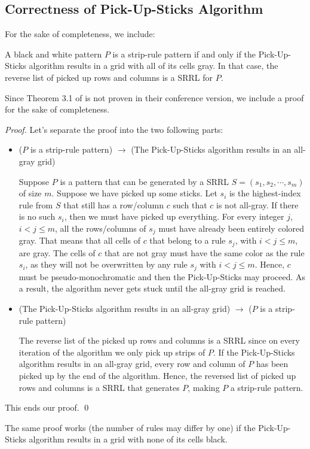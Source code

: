 \subsection{Correctness of Pick-Up-Sticks Algorithm}
\label{corr_pus}

For the sake of completeness, we include:
\begin{theorem} 
\label{theorem_pick_up_sticks}
A black and white pattern $P$ is a strip-rule pattern if and only if the Pick-Up-Sticks algorithm results in a grid with  all of its cells gray.
In that case, the reverse list of picked up rows
and columns is a SRRL for $P$.
\end{theorem}

Since Theorem 3.1 of \cite{ACJKLW07} is not proven in their conference version,
we include a proof for the sake of completeness.

\begin{proof}
Let's separate the proof into the two following parts:
\begin{itemize}
\item ($P$ is a strip-rule pattern) $\rightarrow$ (The Pick-Up-Sticks algorithm results in an all-gray grid)

Suppose $P$ is a pattern that can be generated by a SRRL
$S = (s_{1},s_{2},\cdots,s_{m})$ of size $m$.  Suppose we have picked up some
sticks.
Let $s_{i}$ is the highest-index rule from $S$ that still has a
row/column $c$ such that $c$ is not all-gray.
If there is no such $s_{i}$, then we must have picked up everything.
For every integer $j$, $i < j \leq m$,
all the rows/columns of $s_{j}$ must have already been entirely colored gray.
That means that all cells of $c$ that belong to a rule $s_{j}$, with
$i < j \leq m$, are gray. The cells of $c$ that are not gray must have
the same color as the rule $s_{i}$, as they will not be overwritten
by any rule $s_{j}$ with $i < j \leq m$.
Hence, $c$ must be pseudo-monochromatic and then the Pick-Up-Sticks may proceed. As a result, the algorithm never gets stuck until the all-gray grid is reached.

\item (The Pick-Up-Sticks algorithm results in an all-gray grid) $\rightarrow$ ($P$ is a strip-rule pattern)

The reverse list of the picked up rows and columns is a SRRL since on every iteration of the algorithm we only pick up strips of $P$. If the Pick-Up-Sticks algorithm results in an all-gray grid, every row and column of $P$ has been picked up by the end of the algorithm. Hence, the reversed list of picked up rows and columns is a SRRL that generates $P$, making $P$ a strip-rule pattern.
\end{itemize}

This ends our proof.
\qed
\end{proof}

The same proof works (the number of rules may differ by one) if
the Pick-Up-Sticks algorithm results in a grid with none of its cells black.
